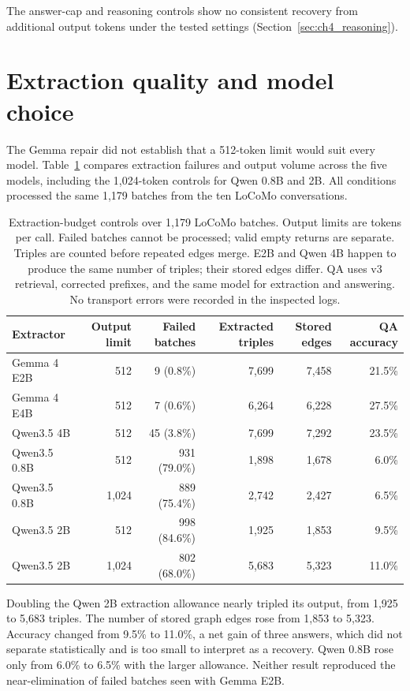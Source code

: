 The answer-cap and reasoning controls show no consistent recovery from additional output
tokens under the tested settings (Section~\ref{sec:ch4_reasoning}).

\section{Extraction quality and model choice}
\label{sec:ch6_extractors}

The Gemma repair did not establish that a 512-token limit would suit every model.
Table~\ref{tab:ch6_extraction} compares extraction failures and output volume across the
five models, including the 1,024-token controls for Qwen 0.8B and 2B. All conditions
processed the same 1,179 batches from the ten LoCoMo conversations.

\begin{table}[htbp]
  \centering
  \small
  \setlength{\tabcolsep}{5pt}
  \begin{tabular}{lrrrrr}
    \toprule
    Extractor & Output limit & Failed batches & Extracted triples & Stored edges & QA accuracy \\
    \midrule
    Gemma 4 E2B  & 512   & 9 (0.8\%)    & 7,699 & 7,458 & 21.5\% \\
    Gemma 4 E4B  & 512   & 7 (0.6\%)    & 6,264 & 6,228 & 27.5\% \\
    Qwen3.5 4B   & 512   & 45 (3.8\%)   & 7,699 & 7,292 & 23.5\% \\
    Qwen3.5 0.8B & 512   & 931 (79.0\%) & 1,898 & 1,678 & 6.0\% \\
    Qwen3.5 0.8B & 1,024 & 889 (75.4\%) & 2,742 & 2,427 & 6.5\% \\
    Qwen3.5 2B   & 512   & 998 (84.6\%) & 1,925 & 1,853 & 9.5\% \\
    Qwen3.5 2B   & 1,024 & 802 (68.0\%) & 5,683 & 5,323 & 11.0\% \\
    \bottomrule
  \end{tabular}
  \caption{Extraction-budget controls over 1,179 LoCoMo batches. Output limits are tokens per call.
  Failed batches cannot be processed; valid empty returns are separate. Triples are counted
  before repeated edges merge. E2B and Qwen 4B happen to produce the same number of triples;
  their stored edges differ. QA uses v3 retrieval, corrected prefixes, and the same model for
  extraction and answering. No transport errors were recorded in the inspected logs.}
  \label{tab:ch6_extraction}
\end{table}

Doubling the Qwen 2B extraction allowance nearly tripled its output, from 1,925 to 5,683
triples. The number of stored graph edges rose from 1,853 to 5,323. Accuracy changed from
9.5\% to 11.0\%, a net gain of three answers, which did not separate statistically and is
too small to interpret as a recovery. Qwen 0.8B rose only from 6.0\% to 6.5\%
with the larger allowance. Neither result reproduced the near-elimination of
failed batches seen with Gemma E2B.


